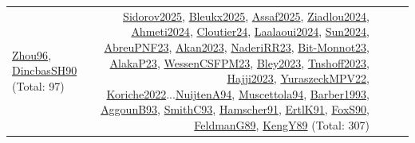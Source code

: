 {\begin{longtable}{p{3cm}r>{\raggedright\arraybackslash}p{6cm}>{\raggedright\arraybackslash}p{6cm}>{\raggedright\arraybackslash}p{8cm}}
\hyperref[detail:Zhou96]{Zhou96}, \hyperref[detail:DincbasSH90]{DincbasSH90} (Total: 97) & \hyperref[detail:Sidorov2025]{Sidorov2025}, \hyperref[detail:Bleukx2025]{Bleukx2025}, \hyperref[detail:Assaf2025]{Assaf2025}, \hyperref[detail:Ziadlou2024]{Ziadlou2024}, \hyperref[detail:Ahmeti2024]{Ahmeti2024}, \hyperref[detail:Cloutier24]{Cloutier24}, \hyperref[detail:Laalaoui2024]{Laalaoui2024}, \hyperref[detail:Sun2024]{Sun2024}, \hyperref[detail:AbreuPNF23]{AbreuPNF23}, \hyperref[detail:Akan2023]{Akan2023}, \hyperref[detail:NaderiRR23]{NaderiRR23}, \hyperref[detail:Bit-Monnot23]{Bit-Monnot23}, \hyperref[detail:AlakaP23]{AlakaP23}, \hyperref[detail:WessenCSFPM23]{WessenCSFPM23}, \hyperref[detail:Bley2023]{Bley2023}, \hyperref[detail:Tnshoff2023]{Tnshoff2023}, \hyperref[detail:Hajji2023]{Hajji2023}, \hyperref[detail:YuraszeckMPV22]{YuraszeckMPV22}, \hyperref[detail:Koriche2022]{Koriche2022}...\hyperref[detail:NuijtenA94]{NuijtenA94}, \hyperref[detail:Muscettola94]{Muscettola94}, \hyperref[detail:Barber1993]{Barber1993}, \hyperref[detail:AggounB93]{AggounB93}, \hyperref[detail:SmithC93]{SmithC93}, \hyperref[detail:Hamscher91]{Hamscher91}, \hyperref[detail:ErtlK91]{ErtlK91}, \hyperref[detail:FoxS90]{FoxS90}, \hyperref[detail:FeldmanG89]{FeldmanG89}, \hyperref[detail:KengY89]{KengY89} (Total: 307)\\

\end{longtable}}

